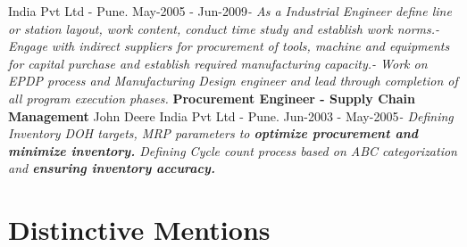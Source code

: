 \documentclass[11pt, a4paper]{awesome-cv}
\begin{document}
India Pvt Ltd - Pune\newline . \hfill May-2005 -
Jun-2009\newline \textit{- \hspace{5mm}  As a Industrial Engineer define line or station layout, work content, conduct time study and establish work norms.\newline - \hspace{5mm}  Engage with indirect suppliers for procurement of tools, machine and equipments for capital purchase and establish required manufacturing capacity.\newline - \hspace{5mm}  Work on EPDP process and Manufacturing Design engineer and lead through completion of all program execution phases.}
\newline \vspace{2mm} \newline
\textbf{Procurement Engineer - Supply Chain Management} \hfill John
Deere India Pvt Ltd - Pune\newline . \hfill Jun-2003 -
May-2005\newline \textit{- \hspace{5mm}  Defining Inventory DOH targets,  MRP parameters to \textbf{optimize procurement and minimize inventory.} Defining Cycle count process based on ABC categorization and \textbf{ensuring inventory accuracy.}}
\newline \vspace{2mm} \newline

\hypertarget{distinctive-mentions}{%
\section{Distinctive Mentions}\label{distinctive-mentions}}
\end{document}
